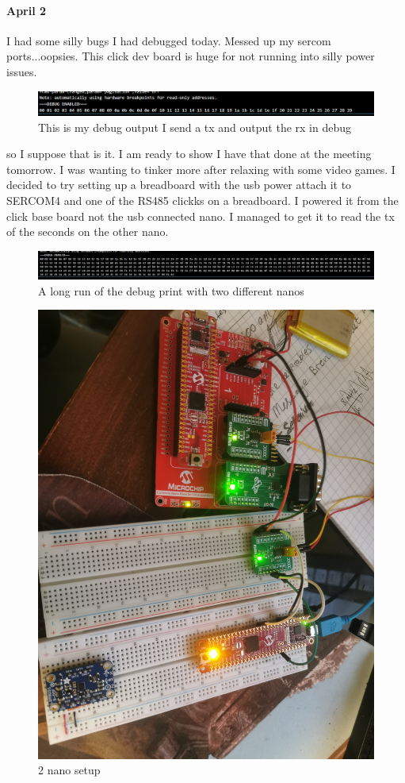 \documentclass{article}
\begin{document}
\paragraph{April 2} I had some silly bugs I had debugged today. Messed up my sercom ports...oopsies. This click dev board is huge for not running into silly power issues. 
\begin{figure}
    \centering
    \includegraphics[width=0.5\linewidth]{RS485Debugg.png}
    \caption{This is my debug output I send a tx and output the rx in debug}
    \label{fig:enter-label}
\end{figure}
so I suppose that is it. I am ready to show I have that done at the meeting tomorrow. I was wanting to tinker more after relaxing with some video games. I decided to try setting up a breadboard with the usb power attach it to SERCOM4 and one of the RS485 clickks on a breadboard. I powered it from the click base board not the usb connected nano. I managed to get it to read the tx of the seconds on the other nano.
\begin{figure}
    \centering
    \includegraphics[width=0.5\linewidth]{RS485Debugg2.png}
    \caption{A long run of the debug print with two different nanos}
    \label{fig:enter-label}
\end{figure}
\begin{figure}
    \centering
    \includegraphics[width=0.5\linewidth]{setup-2-nano.jpg}
    \caption{2 nano setup}
    \label{fig:enter-label}
\end{figure}
\end{document}
